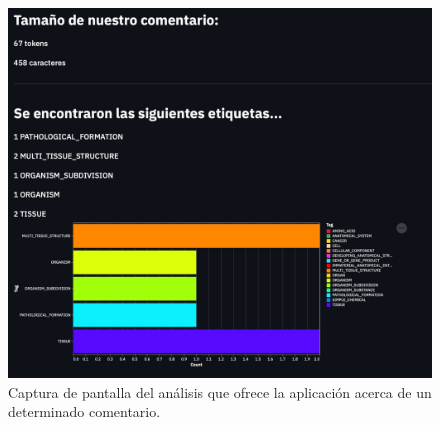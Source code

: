 \begin{figure}[h]
	\centering
	\includegraphics[width=.62\textwidth]{media/analysis_comment.jpeg}
	\caption{Captura de pantalla del análisis que ofrece la aplicación acerca de un determinado comentario.}
	\label{fig:analysis-comment}
\end{figure}







